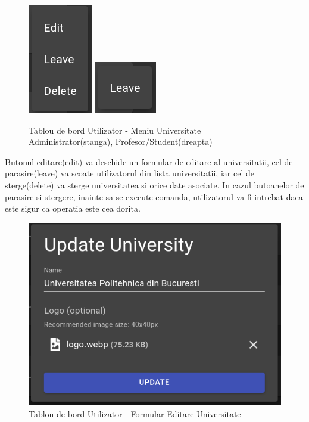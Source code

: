 \documentclass[12pt, a4paper, oneside, romanian]{teza-upb}
\begin{document}
\begin{figure}[H]
\centering
\includegraphics*[width=0.15\columnwidth]{tablou-de-bord-utilizator-meniu-universitate-administrator}
\includegraphics*[width=0.15\columnwidth]{tablou-de-bord-utilizator-meniu-universitate-profesor-student}
\caption{Tablou de bord Utilizator - Meniu Universitate Administrator(stanga), Profesor/Student(dreapta)}
\label{tablou-de-bord-utilizator-meniu-universitate}
\end{figure}

Butonul editare(edit) va deschide un formular de editare al universitatii, cel de parasire(leave) va scoate utilizatorul din lista universitatii, iar cel de sterge(delete) va sterge universitatea si orice date asociate. In cazul butoanelor de parasire si stergere, inainte sa se execute comanda, utilizatorul va fi intrebat daca este sigur ca operatia este cea dorita.

\begin{figure}[H]
\centering
\includegraphics*[width=0.6\columnwidth]{tablou-de-bord-utilizator-formular-editare-universitate}
\caption{Tablou de bord Utilizator - Formular Editare Universitate}
\label{tablou-de-bord-utilizator-formular-editare-universitate}
\end{figure}
\end{document}
